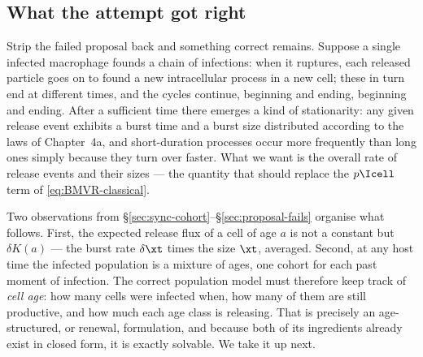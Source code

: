 \subsection{What the attempt got right}
\label{sec:attempt-right}

Strip the failed proposal back and something correct remains. Suppose a
single infected macrophage founds a chain of infections: when it ruptures,
each released particle goes on to found a new intracellular process in a new
cell; these in turn end at different times, and the cycles continue,
beginning and ending, beginning and ending. After a sufficient time there
emerges a kind of stationarity: any given release event exhibits a burst
time and a burst size distributed according to the laws of Chapter~4a, and
short-duration processes occur more frequently than long ones simply
because they turn over faster. What we want
is the overall rate of release events and their sizes --- the quantity that
should replace the $p\Icell$ term of \eqref{eq:BMVR-classical}.

Two observations from \S\ref{sec:sync-cohort}--\S\ref{sec:proposal-fails}
organise what follows. First, the expected release flux of a cell of age
$a$ is not a constant but $\delta K(a)$ --- the burst rate $\delta\xt$ times
the size $\xt$, averaged. Second, at any host time the infected population
is a mixture of ages, one cohort for each past moment of infection. The
correct population model must therefore keep track of \emph{cell age}: how
many cells were infected when, how many of them are still productive, and
how much each age class is releasing. That is precisely an age-structured,
or renewal, formulation, and because both of its ingredients already exist
in closed form, it is exactly solvable. We take it up next.
